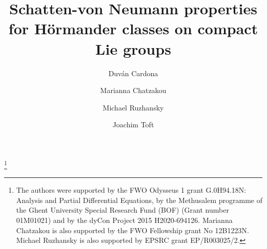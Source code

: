 \documentclass[12pt, reqno]{amsart}
\theoremstyle{definition}
\theoremstyle{remark}
\numberwithin{equation}{section}
\begin{document}
\setcounter{page}{1}

\title[Schatten properties for H\"ormander classes on compact Lie groups]{Schatten-von Neumann properties for H\"ormander classes on compact Lie groups}

 
\author[D. Cardona]{Duv\'an Cardona}
\address{
  Duv\'an Cardona:
  \endgraf
  Department of Mathematics: Analysis, Logic and Discrete Mathematics
  \endgraf
  Ghent University, Belgium
  \endgraf
  {\it E-mail address} {\rm duvan.cardonasanchez@ugent.be}
  }
  
  \author[M. Chatzakou]{Marianna Chatzakou}
\address{
  Marianna Chatzakou:
  \endgraf
  Department of Mathematics: Analysis, Logic and Discrete Mathematics
  \endgraf
  Ghent University, Belgium
  \endgraf
  {\it E-mail address} {\rm Marianna.Chatzakou@UGent.be}
  }
  
  
  
  

\author[M. Ruzhansky]{Michael Ruzhansky}
\address{
  Michael Ruzhansky:
  \endgraf
  Department of Mathematics: Analysis, Logic and Discrete Mathematics
  \endgraf
  Ghent University, Belgium
  \endgraf
 and
  \endgraf
  School of Mathematical Sciences
  \endgraf
  Queen Mary University of London
  \endgraf
  United Kingdom
  \endgraf
  {\it E-mail address} {\rm michael.ruzhansky@ugent.be}
  }

\author[J. Toft]{Joachim Toft}
\address{
  Joachim Toft:
  \endgraf
   Department of Mathematics
  \endgraf
  Linnæus University
  \endgraf
  V\"axj\"o-Sweden
  \endgraf
    {\it E-mail address} {\rm joachim.toft@lnu.se }}


\thanks{The authors were supported  by the FWO  O\textnormal{d}ysseus  1  grant  G.0H94.18N:  Analysis  and  Partial Differential Equations, by the Methusalem programme of the Ghent University Special Research Fund (BOF)
(Grant number 01M01021) and by the  \textnormal{d}yCon Project 2015 H2020-694126. Marianna Chatzakou is also supported by the FWO Fellowship grant No 12B1223N.  Michael Ruzhansky is also supported  by EPSRC grant 
EP/R003025/2.
}

\end{document}
